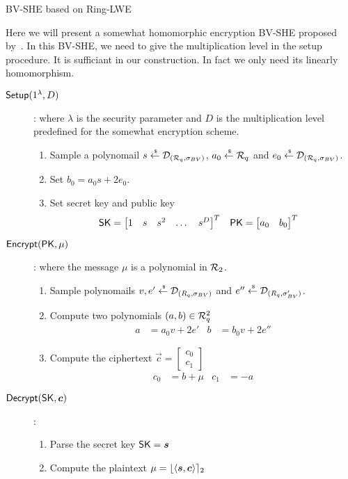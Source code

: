 \begin{subsection}{BV-SHE based on Ring-LWE~\cite{DBLP:conf/crypto/BrakerskiV11}}

  Here we will present a somewhat homomorphic encryption BV-SHE proposed by~\cite{DBLP:conf/crypto/BrakerskiV11}.
  In this BV-SHE, we need to give the multiplication level in the setup procedure.
  It is sufficiant in our construction.
  In fact we only need its linearly homomorphism.
  
  \begin{description}
  \item[${\mathsf{Setup}}(1^\lambda, D)$]: where $\lambda$ is the security parameter and $D$ is the multiplication level predefined for the somewhat encryption scheme.
    \begin{enumerate}
    \item Sample a polynomail $s \stackrel{{\scriptscriptstyle \mkern4mu \$}}{\gets} \mathcal{D}_{({\mathcal{R}}_q, \sigma_{BV})}$, $a_0 \stackrel{{\scriptscriptstyle \mkern4mu \$}}{\gets} {\mathcal{R}}_q$ and $e_0 \stackrel{{\scriptscriptstyle \mkern4mu \$}}{\gets} \mathcal{D}_{({\mathcal{R}}_q, \sigma_{BV})}$.
    \item Set $b_0 = a_0 s + 2 e_0$.
    \item Set secret key and public key
      \begin{align*}
        \mathsf{SK} &= \begin{bmatrix} 1 & s & s^2 & \dots & s^D\end{bmatrix}^T & \mathsf{PK} &= \begin{bmatrix} a_0 & b_0\end{bmatrix}^T
      \end{align*}
    \end{enumerate}
  \item[${\mathsf{Encrypt}}(\mathsf{PK}, \mu)$]: where the message $\mu$ is a polynomial in ${\mathcal{R}}_2$.
    \begin{enumerate}
    \item Sample polynomails $v,e' \stackrel{{\scriptscriptstyle \mkern4mu \$}}{\gets} \mathcal{D}_{(R_q, \sigma_{BV})}$ and $e'' \stackrel{{\scriptscriptstyle \mkern4mu \$}}{\gets}  \mathcal{D}_{(R_q, \sigma_{BV}')}$.
    \item Compute two polynomials $(a, b) \in {\mathcal{R}}_q^2$
      \begin{align*}
        a &= a_0 v + 2 e' & b &= b_0 v +2 e'' 
      \end{align*}
    \item Compute the ciphertext $\vec{c} = \begin{bmatrix} c_0 \\ c_1\end{bmatrix}$
      \begin{align*}
        c_0 &= b + \mu & c_1 &= -a
      \end{align*}
    \end{enumerate}
  \item[$\Dec(\SK, \vec{c})$]:
    \begin{enumerate}
    \item Parse the secret key $\SK = \vec{s}$
    \item Compute the plaintext $\mu = \round{\langle \vec{s}, \vec{c}\rangle}_2$
    \end{enumerate}
  \end{description}
\end{subsection}



